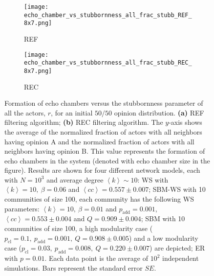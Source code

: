\documentclass[11 pt , letterpaper , twoside , openright]{book}
\begin{document}
\begin{figure}[H]
  \begin{subfigure}[b]{0.49\textwidth}
    \caption{REF}
  	\texttt{[image: echo\_chamber\_vs\_stubbornness\_all\_frac\_stubb\_REF\_8x7.png]}
    \label{REF_all_frac_stubb}
  \end{subfigure}
  \begin{subfigure}[b]{0.49\textwidth}
    \caption{REC}
  	\texttt{[image: echo\_chamber\_vs\_stubbornness\_all\_frac\_stubb\_REC\_8x7.png]}
    \label{REC_all_frac_stubb}
  \end{subfigure}
  \captionsetup{format=plain}
  \caption[Formation of echo chambers versus the stubbornness parameter of all the actors, $r$, for the REF and REC filtering algorithms and an initial $50/50$ opinion distribution.]{Formation of echo chambers versus the stubbornness parameter of all the actors, $r$, for an initial $50/50$ opinion distribution. \textbf{(a)} REF filtering algorithm; \textbf{(b)} REC filtering algorithm. The $y$-axis shows the average of the normalized fraction of actors with all neighbors having opinion A and the normalized fraction of actors with all neighbors having opinion B. This value represents the formation of echo chambers in the system (denoted with echo chamber size in the figure). Results are shown for four different network models, each with $N=10^3$ and average degree $\left<k\right> \sim 10$: WS with $\left<k\right> =10,\ \beta = 0.06$ and $\left<cc\right> = 0.557 \pm 0.007$; SBM-WS with 10 communities of size 100, each community has the following WS parameters: $\left<k\right> = 10,\ \beta = 0.01$ and $p_{\text{add}} = 0.001$, $\left<cc\right> = 0.553 \pm 0.004$ and $Q = 0.909 \pm 0.004$; SBM with 10 communities of size 100, a high modularity case ($p_{\text{cl}} = 0.1,\ p_{\text{add}} = 0.001,\ Q = 0.908 \pm 0.005$) and a low modularity case ($p_{\text{cl}} = 0.03,\ p_{\text{add}} = 0.008,\ Q = 0.220 \pm 0.007$) are depicted; ER with $p= 0.01$. Each data point is the average of $10^2$ independent simulations. Bars represent the standard error $SE$.}
\label{echo_vs_all_frac_stubb_REF-REC}
\end{figure}
\noindent
\end{document}
